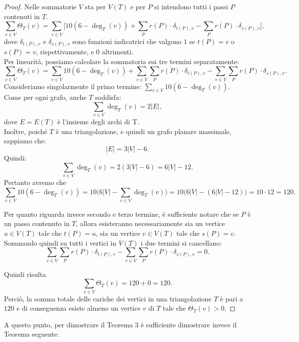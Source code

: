 \documentclass[a4paper,12pt,titlepage]{report}
\begin{document}
    \begin{proof}
    	Nelle sommatorie $V$ sta per $V(T)$ e per $P$ si intendono tutti i passi $P$ contenuti in $T$.
    	\[
    	\sum_{v \in V} \Theta_T(v) = \sum_{v \in V} \Big[ 10(6 - \deg_T(v)) + \sum_{P} r(P) \cdot \delta_{t(P), v} - \sum_{P} r(P) \cdot \delta_{s(P), v} \Big],
    	\]
    	dove $\delta_{t(P), v}$ e $\delta_{s(P), v}$ sono funzioni indicatrici che valgono $1$ se $t(P) = v$ o $s(P) = v$, rispettivamente, e $0$ altrimenti.
    	\\Per linearità, possiamo calcolare la sommatoria sui tre termini separatamente:
    	\[
    	\sum_{v \in V} \Theta_T(v) = \sum_{v \in V} 10(6 - \deg_T(v)) + \sum_{v \in V} \sum_{P} r(P) \cdot \delta_{t(P), v} - \sum_{v \in V} \sum_{P} r(P) \cdot \delta_{s(P), v}.
    	\]
    	Consideriamo singolarmente il primo termine: $\sum_{v \in V} 10(6 - \deg_T(v))$.
    	\\Come per ogni grafo, anche $T$ soddisfa:
    	\[
    	\sum_{v \in V} \deg_T(v) = 2\lvert E \rvert,
     	\]
    	dove $E = E(T)$ è l'insieme degli archi di T. 
    	\\Inoltre, poiché $T$ è una triangolazione, e quindi un grafo planare massimale, sappiamo che:
    	\[
    	\lvert E \rvert = 3\lvert V \rvert - 6.
    	\]
    	Quindi:
    	\[
    	\sum_{v \in V} \deg_T(v) = 2(3\lvert V \rvert - 6) = 6\lvert V \rvert - 12.
    	\]
    	Pertanto avremo che
    	\[
    	\sum_{v \in V} 10(6 - \deg_T(v)) = 10 \Big(6\lvert V \rvert - \sum_{v \in V} \deg_T(v)\Big) = 10 \Big(6\lvert V \rvert - (6\lvert V \rvert - 12)\Big) = 10 \cdot 12 = 120.
    	\]
    	
    	Per quanto riguarda invece secondo e terzo termine, è sufficiente notare che se $P$ è un passo contenuto in $T$, allora esisteranno necessariamente sia un vertice $u \in V(T)$ tale che $t(P) = u$, sia un vertice $v \in V(T)$ tale che $s(P) = v$.
    	\\Sommando quindi su tutti i vertici in $V(T)$ i due termini si cancellano:
    	\[
    	\sum_{v \in V} \sum_{P} r(P) \cdot \delta_{t(P), v} - \sum_{v \in V} \sum_{P} r(P) \cdot \delta_{s(P), v} = 0.
    	\]
    	
    	Quindi risulta
    	\[
    	\sum_{v \in V} \Theta_T(v) = 120 + 0 = 120.
    	\]
    	Perciò, la somma totale delle cariche dei vertici in una triangolazione $T$ è pari a $120$ e di conseguenza esiste almeno un vertice $v$ di $T$ tale che $\Theta_T(v) > 0$.
    \end{proof}
    A questo punto, per dimostrare il Teorema 3 è sufficiente dimostrare invece il Teorema seguente.
\end{document}
